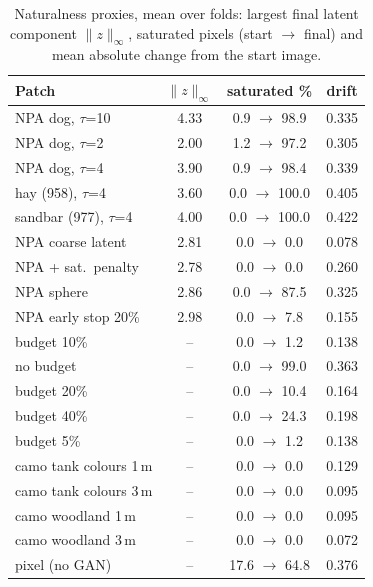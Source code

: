 \begin{table}[htbp]\centering\scriptsize
\caption{Naturalness proxies, mean over folds: largest final latent component $\lVert z\rVert_\infty$, saturated pixels (start $\to$ final) and mean absolute change from the start image.}\label{tab:a-nat}
\setlength{\tabcolsep}{3pt}
\begin{tabular}{@{}lccc@{}}
\toprule
Patch & $\lVert z\rVert_\infty$ & saturated \% & drift\\
\midrule
NPA dog, $\tau$=10 & 4.33 & 0.9 $\to$ 98.9 & 0.335\\
NPA dog, $\tau$=2 & 2.00 & 1.2 $\to$ 97.2 & 0.305\\
NPA dog, $\tau$=4 & 3.90 & 0.9 $\to$ 98.4 & 0.339\\
hay (958), $\tau$=4 & 3.60 & 0.0 $\to$ 100.0 & 0.405\\
sandbar (977), $\tau$=4 & 4.00 & 0.0 $\to$ 100.0 & 0.422\\
NPA coarse latent & 2.81 & 0.0 $\to$ 0.0 & 0.078\\
NPA + sat.\ penalty & 2.78 & 0.0 $\to$ 0.0 & 0.260\\
NPA sphere & 2.86 & 0.0 $\to$ 87.5 & 0.325\\
NPA early stop 20\% & 2.98 & 0.0 $\to$ 7.8 & 0.155\\
budget 10\% & -- & 0.0 $\to$ 1.2 & 0.138\\
no budget & -- & 0.0 $\to$ 99.0 & 0.363\\
budget 20\% & -- & 0.0 $\to$ 10.4 & 0.164\\
budget 40\% & -- & 0.0 $\to$ 24.3 & 0.198\\
budget 5\% & -- & 0.0 $\to$ 1.2 & 0.138\\
camo tank colours 1\,m & -- & 0.0 $\to$ 0.0 & 0.129\\
camo tank colours 3\,m & -- & 0.0 $\to$ 0.0 & 0.095\\
camo woodland 1\,m & -- & 0.0 $\to$ 0.0 & 0.095\\
camo woodland 3\,m & -- & 0.0 $\to$ 0.0 & 0.072\\
pixel (no GAN) & -- & 17.6 $\to$ 64.8 & 0.376\\
\bottomrule
\end{tabular}
\end{table}
